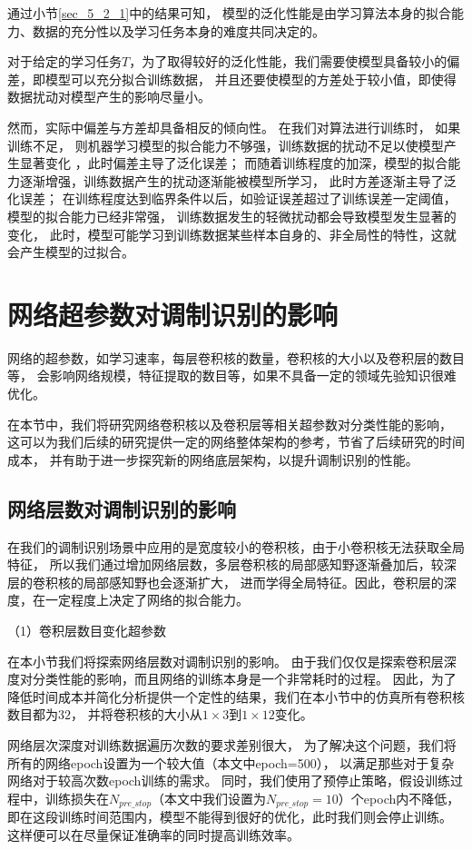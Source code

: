 通过小节\ref{sec_5_2_1}中的结果可知，
模型的泛化性能是由学习算法本身的拟合能力、数据的充分性以及学习任务本身的难度共同决定的。

对于给定的学习任务$T$，为了取得较好的泛化性能，我们需要使模型具备较小的偏差，即模型可以充分拟合训练数据，
并且还要使模型的方差处于较小值，即使得数据扰动对模型产生的影响尽量小。\par

然而，实际中偏差与方差却具备相反的倾向性。
在我们对算法进行训练时，
如果训练不足， 则机器学习模型的拟合能力不够强，训练数据的扰动不足以使模型产生显著变化
，此时偏差主导了泛化误差；
而随着训练程度的加深，模型的拟合能力逐渐增强，训练数据产生的扰动逐渐能被模型所学习，
此时方差逐渐主导了泛化误差；
在训练程度达到临界条件以后，如验证误差超过了训练误差一定阈值，模型的拟合能力已经非常强，
训练数据发生的轻微扰动都会导致模型发生显著的变化，
此时，模型可能学习到训练数据某些样本自身的、非全局性的特性，这就会产生模型的过拟合。\par

\section{网络超参数对调制识别的影响}
网络的超参数，如学习速率，每层卷积核的数量，卷积核的大小以及卷积层的数目等，
会影响网络规模，特征提取的数目等，如果不具备一定的领域先验知识很难优化。\par

在本节中，我们将研究网络卷积核以及卷积层等相关超参数对分类性能的影响，
这可以为我们后续的研究提供一定的网络整体架构的参考，节省了后续研究的时间成本，
并有助于进一步探究新的网络底层架构，以提升调制识别的性能。\par

\subsection{网络层数对调制识别的影响}
在我们的调制识别场景中应用的是宽度较小的卷积核，由于小卷积核无法获取全局特征，
所以我们通过增加网络层数，多层卷积核的局部感知野逐渐叠加后，较深层的卷积核的局部感知野也会逐渐扩大，
进而学得全局特征。因此，卷积层的深度，在一定程度上决定了网络的拟合能力。\par

（1）卷积层数目变化超参数\par

在本小节我们将探索网络层数对调制识别的影响。
由于我们仅仅是探索卷积层深度对分类性能的影响，而且网络的训练本身是一个非常耗时的过程。
因此，为了降低时间成本并简化分析提供一个定性的结果，我们在本小节中的仿真所有卷积核数目都为$32$，
并将卷积核的大小从$1\times3$到$1\times12$变化。\par
网络层次深度对训练数据遍历次数的要求差别很大，
为了解决这个问题，我们将所有的网络epoch设置为一个较大值（本文中epoch=500），
以满足那些对于复杂网络对于较高次数epoch训练的需求。
同时，我们使用了预停止策略，假设训练过程中，训练损失在$N_{pre\_stop}$（本文中我们设置为$N_{pre\_stop}=10$）个epoch内不降低，
即在这段训练时间范围内，模型不能得到很好的优化，此时我们则会停止训练。
这样便可以在尽量保证准确率的同时提高训练效率。\par

